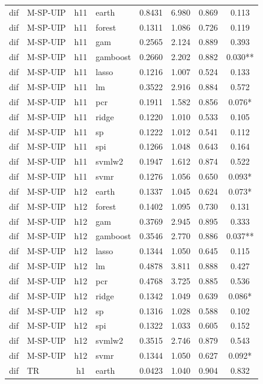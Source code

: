 \begin{ThreePartTable}
\begin{longtable}[t]{llclcccc}
\addlinespace
dif & M-SP-UIP & h11 & earth & 0.8431 & 6.980 & 0.869 & 0.113\\
dif & M-SP-UIP & h11 & forest & 0.1311 & 1.086 & 0.726 & 0.119\\
dif & M-SP-UIP & h11 & gam & 0.2565 & 2.124 & 0.889 & 0.393\\
dif & M-SP-UIP & h11 & gamboost & 0.2660 & 2.202 & 0.882 & 0.030**\\
dif & M-SP-UIP & h11 & lasso & 0.1216 & 1.007 & 0.524 & 0.133\\
dif & M-SP-UIP & h11 & lm & 0.3522 & 2.916 & 0.884 & 0.572\\
dif & M-SP-UIP & h11 & pcr & 0.1911 & 1.582 & 0.856 & 0.076*\\
dif & M-SP-UIP & h11 & ridge & 0.1220 & 1.010 & 0.533 & 0.105\\
dif & M-SP-UIP & h11 & sp & 0.1222 & 1.012 & 0.541 & 0.112\\
dif & M-SP-UIP & h11 & spi & 0.1266 & 1.048 & 0.643 & 0.164\\
dif & M-SP-UIP & h11 & svmlw2 & 0.1947 & 1.612 & 0.874 & 0.522\\
dif & M-SP-UIP & h11 & svmr & 0.1276 & 1.056 & 0.650 & 0.093*\\
\addlinespace
dif & M-SP-UIP & h12 & earth & 0.1337 & 1.045 & 0.624 & 0.073*\\
dif & M-SP-UIP & h12 & forest & 0.1402 & 1.095 & 0.730 & 0.131\\
dif & M-SP-UIP & h12 & gam & 0.3769 & 2.945 & 0.895 & 0.333\\
dif & M-SP-UIP & h12 & gamboost & 0.3546 & 2.770 & 0.886 & 0.037**\\
dif & M-SP-UIP & h12 & lasso & 0.1344 & 1.050 & 0.645 & 0.115\\
dif & M-SP-UIP & h12 & lm & 0.4878 & 3.811 & 0.888 & 0.427\\
dif & M-SP-UIP & h12 & pcr & 0.4768 & 3.725 & 0.885 & 0.536\\
dif & M-SP-UIP & h12 & ridge & 0.1342 & 1.049 & 0.639 & 0.086*\\
dif & M-SP-UIP & h12 & sp & 0.1316 & 1.028 & 0.588 & 0.102\\
dif & M-SP-UIP & h12 & spi & 0.1322 & 1.033 & 0.605 & 0.152\\
dif & M-SP-UIP & h12 & svmlw2 & 0.3515 & 2.746 & 0.879 & 0.543\\
dif & M-SP-UIP & h12 & svmr & 0.1344 & 1.050 & 0.627 & 0.092*\\
\addlinespace
dif & TR & h1 & earth & 0.0423 & 1.040 & 0.904 & 0.832\\

\end{longtable}
\end{ThreePartTable}
